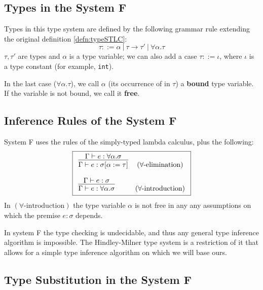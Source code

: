 \subsection{Types in the System F}

\begin{defn} Types in this type system are defined by the following grammar rule extending the original definition \ref{defn:typeSTLC}:
    $$\tau ::= \alpha\ |\ \tau \rightarrow \tau'\ |\ \forall \alpha . \tau$$
    $\tau, \tau'$ are types and $\alpha$ is a type variable; we can also add a case $\tau ::= \iota$, where $\iota$ is a type constant (for example, \lstinline{int}).
\end{defn}

In the last case ($\forall \alpha . \tau$), we call $\alpha$ (its occurrence of in $\tau$) a \textbf{bound} type variable. If the variable is not bound, we call it \textbf{free}.

\subsection{Inference Rules of the System F}

\begin{defn}
    System F uses the rules of the simply-typed lambda calculus, plus the following:
    $$\boxed{\begin{array}{l c}
        \infer{\Gamma \vdash e : \sigma [\alpha := \tau]}{\Gamma \vdash e : \forall \alpha . \sigma} & (\text{$\forall$-elimination})\\\\
        \infer{\Gamma \vdash e : \forall \alpha . \sigma}{\Gamma \vdash e : \sigma} & (\text{$\forall$-introduction})
    \end{array}}$$
    In $(\text{$\forall$-introduction})$ the type variable $\alpha$ is not free in any any assumptions on which the premise $e : \sigma$ depends.
\end{defn}

In system F the type checking is undecidable, and thus any general type inference algorithm is impossible. The Hindley-Milner type system is a restriction of it that allows for a simple type inference algorithm on which we will base ours.

\subsection{Type Substitution in the System F}
\label{ssec:substitutionF}

